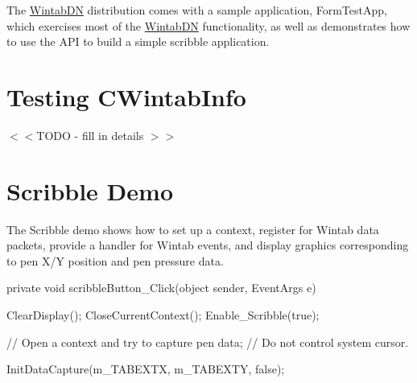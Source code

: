 The \hyperlink{namespace_wintab_d_n}{WintabDN} distribution comes with a sample application, FormTestApp, which exercises most of the \hyperlink{namespace_wintab_d_n}{WintabDN} functionality, as well as demonstrates how to use the API to build a simple scribble application.\hypertarget{page_testWTInfo_sec}{}\section{Testing CWintabInfo}\label{page_testWTInfo_sec}
$<$$<$TODO -\/ fill in details $>$$>$\hypertarget{page_scribbleDemo_sec}{}\section{Scribble Demo}\label{page_scribbleDemo_sec}
The Scribble demo shows how to set up a context, register for Wintab data packets, provide a handler for Wintab events, and display graphics corresponding to pen X/Y position and pen pressure data.


\begin{DoxyCode}
      private void scribbleButton_Click(object sender, EventArgs e)
        {
            ClearDisplay();
            CloseCurrentContext();
            Enable_Scribble(true);

            // Open a context and try to capture pen data;
            // Do not control system cursor.

            InitDataCapture(m_TABEXTX, m_TABEXTY, false);
        }
\end{DoxyCode}
 